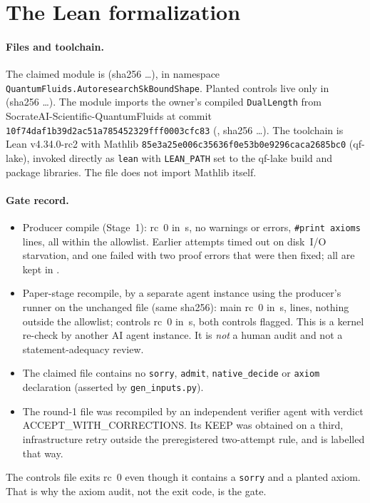 \documentclass[11pt]{article}
\theoremstyle{remark}
\newcommand{\lean}[1]{\texttt{#1}}
\begin{document}
\section{The Lean formalization}\label{sec:lean}
\paragraph{Files and toolchain.} The claimed module is
 (sha256 \LeanShaShort\ldots), in
namespace \lean{QuantumFluids.AutoresearchSkBoundShape}. Planted controls live only in
 (sha256 \CtlShaShort\ldots). The module imports the owner's compiled
\lean{DualLength} from SocrateAI-Scientific-QuantumFluids at commit
\texttt{10f74daf1b39d2ac51a785452329fff0003cfc83} (, sha256 \OwnerShaShort\ldots). The
toolchain is Lean v4.34.0-rc2 with Mathlib \texttt{85e3a25e006c35636f0e53b0e9296caca2685bc0} (qf-lake), invoked
directly as \texttt{lean} with \texttt{LEAN\_PATH} set to the qf-lake build and package libraries. The file does not
import Mathlib itself.

\paragraph{Gate record.}
\begin{itemize}
\item Producer compile (Stage~1): rc~0 in \ProdSec\,s, no warnings or errors, \NDecl{} \lean{\#print axioms} lines, all
within the allowlist. Earlier attempts timed out on disk~I/O starvation, and one failed with two proof errors that
were then fixed; all are kept in .
\item Paper-stage recompile, by a separate agent instance using the producer's runner on the unchanged file (same
sha256): main rc~0 in \ReSec\,s, \NDecl{} lines, nothing outside the allowlist; controls rc~0 in \ReCtlSec\,s, both
controls flagged. This is a kernel re-check by another AI agent instance. It is \emph{not} a human audit and not a
statement-adequacy review.
\item The claimed file contains no \lean{sorry}, \lean{admit}, \lean{native\_decide} or \lean{axiom} declaration
(asserted by \texttt{gen\_inputs.py}).
\item The round-1 file  was recompiled by an independent verifier agent with
verdict ACCEPT\_WITH\_CORRECTIONS. Its KEEP was obtained on a third, infrastructure retry outside the preregistered
two-attempt rule, and is labelled that way.
\end{itemize}
The controls file exits rc~0 even though it contains a \lean{sorry} and a planted axiom. That is why the axiom
audit, not the exit code, is the gate.
\end{document}
